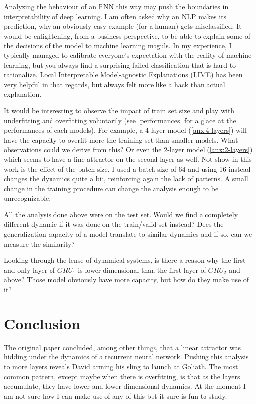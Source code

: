 \documentclass{article}
\begin{document}
Analyzing the behaviour of an RNN this way may push the boundaries in interpretability of deep learning. I am often asked why an NLP makes its prediction, why an obviously easy example (for a human) gets misclassified. It would be enlightening, from a business perspective, to be able to explain some of the decisions of the model to machine learning moguls. In my experience, I typically managed to calibrate everyone's expectation with the reality of machine learning, but you always find a surprising failed classification that is hard to rationalize. Local Interpretable Model-agnostic Explanations (LIME) \cite{ribeiro2016i}  has been very helpful in that regards, but always felt more like a hack than actual explanation.

It would be interesting to observe the impact of train set size and play with underfitting and overfitting voluntarily (see \ref{performances} for a glace at the performances of each models). For example, a 4-layer model (\ref{anx:4-layers}) will have the capacity to overfit more the training set than smaller models. What observations could we derive from this? Or even the 2-layer model (\ref{anx:2-layers}) which seems to have a line attractor on the second layer as well. Not show in this work is the effect of the batch size. I used a batch size of 64 and using 16 instead changes the dynamics quite a bit, reinforcing again the lack of patterns. A small change in the training procedure can change the analysis enough to be unrecognizable.

All the analysis done above were on the test set. Would we find a completely different dynamic if it was done on the train/valid set instead? Does the generalization capacity of a model translate to similar dynamics and if so, can we measure the similarity?

Looking through the lense of dynamical systems, is there a reason why the first and only layer of $GRU_1$ is lower dimensional than the first layer of $GRU_2$ and above? Those model obviously have more capacity, but how do they make use of it?

\section{Conclusion}
The original paper concluded, among other things, that a linear attractor was hidding under the dynamics of a recurrent neural network. Pushing this analysis to more layers reveals David arming his sling to launch at Goliath. The most common pattern, except maybe when there is overfitting, is that as the layers accumulate, they have lower and lower dimensional dynamics. At the moment I am not sure how I can make use of any of this but it sure is fun to study.
\end{document}

